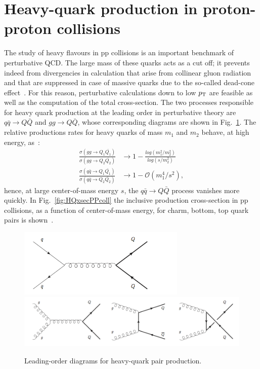 \section{Heavy-quark production in proton-proton collisions}
The study of heavy flavours in pp collisions is an important benchmark of perturbative QCD. 
The large mass of these quarks acts as a cut off; it prevents indeed from divergencies in calculation that arise
from collinear gluon radiation and that are suppressed in case of massive quarks due to the
so-called dead-cone effect~\cite{}. For this reason, perturbative calculations down to low $p_{\rm T}$ are feasible as well as the computation of the total cross-section. 
The two processes responsible for heavy quark production at the leading order in perturbative theory are 
$q \bar{q} \rightarrow Q \bar{Q}$ and $gg \rightarrow Q \bar{Q}$, whose corresponding diagrams are
shown in Fig.~\ref{fig:LOdiagrams}. The relative productions rates for heavy quarks of mass 
$m_1$ and $m_2$ behave, at high energy, as~\cite{Mangano:1997ri}:
\begin{equation}
\begin{aligned}
\frac{\sigma (gg \rightarrow Q_1 \bar{Q_1})}{\sigma (gg \rightarrow Q_2 \bar{Q_2})} & \rightarrow 1 - \frac{log(m_1^2/m_2^2)}{log(s/m_2^2)} \\
\frac{\sigma (q \bar{q} \rightarrow Q_1 \bar{Q_1})}{\sigma (q \bar{q} \rightarrow Q_2 \bar{Q_2})} & \rightarrow 1 - \mathcal{O} (m_1^4/s^2),
\end{aligned}
\end{equation}
hence, at large center-of-mass energy $s$, the $q \bar{q} \rightarrow Q \bar{Q}$ process
vanishes more quickly. In Fig.~\ref{fig:HQxsecPPcoll} the inclusive production cross-section in pp collisions,
as a function of center-of-mass energy, for charm, bottom, top quark pairs is shown~\cite{Mangano:1997ri}.
\begin{figure}[!ht]
  \centering
  \includegraphics[width=8cm]{FigCap2/Feymann1.png}
  \includegraphics[width=15cm]{FigCap2/Feymann2.png}
  \caption{Leading-order diagrams for heavy-quark pair production.}
  \label{fig:LOdiagrams}
\end{figure}
